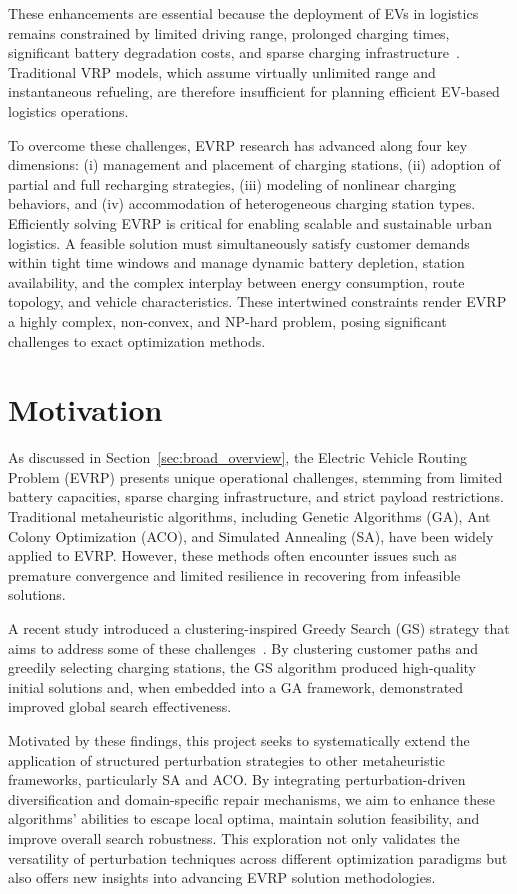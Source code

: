 These enhancements are essential because the deployment of EVs in logistics remains constrained by limited driving range, prolonged charging times, significant battery degradation costs, and sparse charging infrastructure~\cite{nagy2007location}. Traditional VRP models, which assume virtually unlimited range and instantaneous refueling, are therefore insufficient for planning efficient EV-based logistics operations.

To overcome these challenges, EVRP research has advanced along four key dimensions: (i) management and placement of charging stations, (ii) adoption of partial and full recharging strategies, (iii) modeling of nonlinear charging behaviors, and (iv) accommodation of heterogeneous charging station types. Efficiently solving EVRP is critical for enabling scalable and sustainable urban logistics. A feasible solution must simultaneously satisfy customer demands within tight time windows and manage dynamic battery depletion, station availability, and the complex interplay between energy consumption, route topology, and vehicle characteristics. These intertwined constraints render EVRP a highly complex, non-convex, and NP-hard problem, posing significant challenges to exact optimization methods.


\section{Motivation}

As discussed in Section~\ref{sec:broad_overview}, the Electric Vehicle Routing Problem (EVRP) presents unique operational challenges, stemming from limited battery capacities, sparse charging infrastructure, and strict payload restrictions. Traditional metaheuristic algorithms, including Genetic Algorithms (GA), Ant Colony Optimization (ACO), and Simulated Annealing (SA), have been widely applied to EVRP. However, these methods often encounter issues such as premature convergence and limited resilience in recovering from infeasible solutions.

A recent study introduced a clustering-inspired Greedy Search (GS) strategy that aims to address some of these challenges~\cite{hien2023greedy}. By clustering customer paths and greedily selecting charging stations, the GS algorithm produced high-quality initial solutions and, when embedded into a GA framework, demonstrated improved global search effectiveness.

Motivated by these findings, this project seeks to systematically extend the application of structured perturbation strategies to other metaheuristic frameworks, particularly SA and ACO. By integrating perturbation-driven diversification and domain-specific repair mechanisms, we aim to enhance these algorithms' abilities to escape local optima, maintain solution feasibility, and improve overall search robustness. This exploration not only validates the versatility of perturbation techniques across different optimization paradigms but also offers new insights into advancing EVRP solution methodologies.


